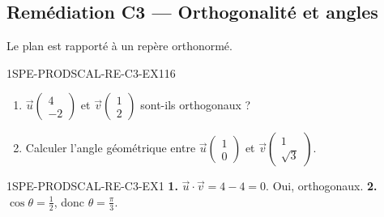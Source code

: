
\subsection*{Remédiation C3 — Orthogonalité et angles}

Le plan est rapporté à un repère orthonormé.

\begin{exercice}{1SPE-PRODSCAL-RE-C3-EX1}{1}{6}
\begin{enumerate}
  \item $\vec{u}\begin{pmatrix} 4 \\ -2 \end{pmatrix}$ et $\vec{v}\begin{pmatrix} 1 \\ 2 \end{pmatrix}$ sont-ils orthogonaux ?
  \item Calculer l'angle géométrique entre $\vec{u}\begin{pmatrix} 1 \\ 0 \end{pmatrix}$ et $\vec{v}\begin{pmatrix} 1 \\ \sqrt{3} \end{pmatrix}$.
\end{enumerate}
\end{exercice}


\begin{corrige}{1SPE-PRODSCAL-RE-C3-EX1}
\textbf{1.} $\vec{u}\cdot\vec{v} = 4-4 = 0$. Oui, orthogonaux.
\textbf{2.} $\cos\theta = \frac{1}{2}$, donc $\theta = \frac{\pi}{3}$.
\end{corrige}

